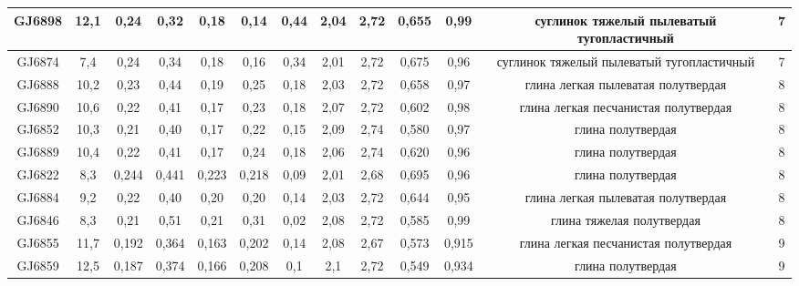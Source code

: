 \begin{landscape}
\begin{sidewaystable}[]
\begin{tabular}{|c|c|c|c|c|c|c|c|c|c|c|c|c|}
    GJ6898          & 12,1       & 0,24                         & 0,32   & 0,18   & 0,14   & 0,44     & 2,04     & 2,72      & 0,655   & 0,99     & суглинок тяжелый   пылеватый тугопластичный  & 7   \\ \hline
    GJ6874          & 7,4        & 0,24                         & 0,34   & 0,18   & 0,16   & 0,34     & 2,01     & 2,72      & 0,675   & 0,96     & суглинок тяжелый   пылеватый тугопластичный  & 7   \\ \hline
    GJ6888          & 10,2       & 0,23                         & 0,44   & 0,19   & 0,25   & 0,18     & 2,03     & 2,72      & 0,658   & 0,97     & глина легкая   пылеватая полутвердая         & 8   \\ \hline
    GJ6890          & 10,6       & 0,22                         & 0,41   & 0,17   & 0,23   & 0,18     & 2,07     & 2,72      & 0,602   & 0,98     & глина легкая   песчанистая полутвердая       & 8   \\ \hline
    GJ6852          & 10,3       & 0,21                         & 0,40   & 0,17   & 0,22   & 0,15     & 2,09     & 2,74      & 0,580   & 0,97     & глина полутвердая                            & 8   \\ \hline
    GJ6889          & 10,4       & 0,22                         & 0,41   & 0,17   & 0,24   & 0,18     & 2,06     & 2,74      & 0,620   & 0,96     & глина полутвердая                            & 8   \\ \hline
    GJ6822          & 8,3        & 0,244                        & 0,441  & 0,223  & 0,218  & 0,09     & 2,01     & 2,68      & 0,695   & 0,96     & глина полутвердая                            & 8   \\ \hline
    GJ6884          & 9,2        & 0,22                         & 0,40   & 0,20   & 0,20   & 0,14     & 2,03     & 2,72      & 0,644   & 0,95     & глина легкая   пылеватая полутвердая         & 8   \\ \hline
    GJ6846          & 8,3        & 0,21                         & 0,51   & 0,21   & 0,31   & 0,02     & 2,08     & 2,72      & 0,585   & 0,99     & глина тяжелая   полутвердая                  & 8   \\ \hline
    GJ6855          & 11,7       & 0,192                        & 0,364  & 0,163  & 0,202  & 0,14     & 2,08     & 2,67      & 0,573   & 0,915    & глина легкая   песчанистая полутвердая       & 9   \\ \hline
    GJ6859          & 12,5       & 0,187                        & 0,374  & 0,166  & 0,208  & 0,1      & 2,1      & 2,72      & 0,549   & 0,934    & глина полутвердая                            & 9   \\ \hline

\end{tabular}
\end{sidewaystable}
\end{landscape}
